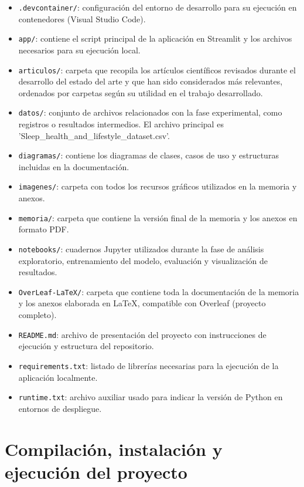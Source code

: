 \begin{itemize}
    \item \texttt{.devcontainer/}: configuración del entorno de desarrollo para su ejecución en contenedores (Visual Studio Code).
    \item \texttt{app/}: contiene el script principal de la aplicación en Streamlit y los archivos necesarios para su ejecución local.
    \item \texttt{articulos/}: carpeta que recopila los artículos científicos revisados durante el desarrollo del estado del arte y que han sido considerados más relevantes, ordenados por carpetas según su utilidad en el trabajo desarrollado.
    \item \texttt{datos/}: conjunto de archivos relacionados con la fase experimental, como registros o resultados intermedios. El archivo principal es 'Sleep\_health\_and\_lifestyle\_dataset.csv'.
    \item \texttt{diagramas/}: contiene los diagramas de clases, casos de uso y estructuras incluidas en la documentación.
    \item \texttt{imagenes/}: carpeta con todos los recursos gráficos utilizados en la memoria y anexos.
    \item \texttt{memoria/}: carpeta que contiene la versión final de la memoria y los anexos en formato PDF. 
    \item \texttt{notebooks/}: cuadernos Jupyter utilizados durante la fase de análisis exploratorio, entrenamiento del modelo, evaluación y visualización de resultados.
    \item \texttt{OverLeaf-LaTeX/}: carpeta que contiene toda la documentación de la memoria y los anexos elaborada en LaTeX, compatible con Overleaf (proyecto completo). 
    \item \texttt{README.md}: archivo de presentación del proyecto con instrucciones de ejecución y estructura del repositorio.
    \item \texttt{requirements.txt}: listado de librerías necesarias para la ejecución de la aplicación localmente.
    \item \texttt{runtime.txt}: archivo auxiliar usado para indicar la versión de Python en entornos de despliegue.

\end{itemize}



\section{Compilación, instalación y ejecución del proyecto}

